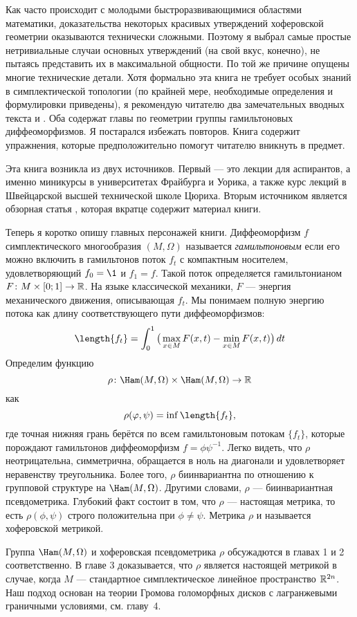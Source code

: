 Как часто происходит с молодыми быстроразвивающимися областями математики, доказательства некоторых красивых утверждений хоферовской геометрии оказываются технически сложными.
Поэтому я выбрал самые простые нетривиальные случаи основных утверждений (на свой вкус, конечно), не пытаясь представить их в максимальной общности.
По той же причине опущены многие технические детали.
Хотя формально эта книга не требует особых знаний в симплектической топологии (по крайней мере, необходимые определения и формулировки приведены), я рекомендую читателю  два замечательных вводных текста \cite{HZ} и \cite{MS}.
Оба содержат главы по геометрии группы гамильтоновых диффеоморфизмов.
Я постарался избежать повторов.
Книга содержит упражнения, которые предположительно помогут читателю вникнуть в предмет.

Эта книга возникла из двух источников.
Первый — это лекции для аспирантов, а именно миникурсы в университетах Фрайбурга и Уорика, а также курс лекций в Швейцарской высшей технической школе Цюриха.
Вторым источником является обзорная статья \cite{P8}, которая вкратце содержит материал книги.

Теперь я коротко опишу главных персонажей книги.
Диффеоморфизм $f$ симплектического многообразия $(M,\Omega)$
называется \emph{гамильтоновым} если его можно включить в гамильтонов поток $f_t$ с компактным носителем, удовлетворяющий $f_0=\1$ и $f_1 =f$.
Такой поток определяется гамильтонианом $F\colon M \times [0;1] \to \mathbb{R}$.
На языке классической механики, $F$ — энергия механического движения, описывающая $f_t$.
Мы понимаем полную энергию потока как длину соответствующего пути диффеоморфизмов:
\[\length \{f_t\} =
\int_0^1\big(\max_{x\in M}F(x,t)-\min_{x\in M}F(x,t)\big)\, dt 
\]%
Определим функцию
\[\rho\: \Ham(M,\Omega) \times \Ham(M,\Omega) \to \RR\]
как
\[\rho (\phi, \psi) = \inf \length \{f_t\},\]
где точная нижняя грань берётся по всем гамильтоновым потокам $\{f_t\}$, которые
порождают гамильтонов диффеоморфизм $f = \phi\psi^{-1}$.
Легко видеть, что $\rho$ неотрицательна, симметрична, обращается в
ноль на диагонали и удовлетворяет неравенству треугольника. 
Более того, $\rho$ биинвариантна по отношению к групповой структуре на $\Ham(M,\Omega)$.
Другими словами, $\rho$ — биинвариантная псевдометрика.
Глубокий факт состоит в том, что $\rho$ — настоящая метрика, то есть
$\rho (\phi, \psi)$ строго положительна при $\phi \ne \psi$. 
Метрика $\rho$ и называется хоферовской метрикой.

Группа $\Ham(M,\Omega)$ и хоферовская псевдометрика $\rho$ обсужадются в главах 1 и 2 соответственно.
В главе 3 доказывается, что $\rho$ является настоящей метрикой в случае, когда $M$ --- стандартное симплектическое линейное пространство $\mathbb{R}^{2n}$.
Наш подход основан на теории Громова голоморфных дисков с лагранжевыми граничными условиями, см.
главу~4.

